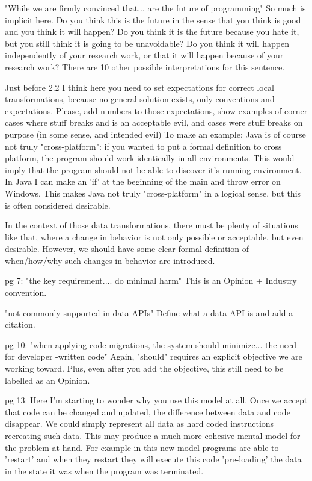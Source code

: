"While we are firmly convinced that... are the future of programming" So much is implicit here. Do you think this is the future in the sense that you think is good and you think it will happen? Do you think it is the future because you hate it, but you still think it is going to be unavoidable? Do you think it will happen independently of your research work, or that it will happen because of your research work? There are 10 other possible interpretations for this sentence.

Just before 2.2 I think here you need to set expectations for correct local transformations, because no general solution exists, only conventions and expectations. Please, add numbers to those expectations, show examples of corner cases where stuff breaks and is an acceptable evil, and cases were stuff breaks on purpose (in some sense, and intended evil) To make an example: Java is of course not truly "cross-platform": if you wanted to put a formal definition to cross platform, the program should work identically in all environments. This would imply that the program should not be able to discover it's running environment. In Java I can make an 'if' at the beginning of the main and throw error on Windows. This makes Java not truly "cross-platform" in a logical sense, but this is often considered desirable.

In the context of those data transformations, there must be plenty of situations like that, where a change in behavior is not only possible or acceptable, but even desirable. However, we should have some clear formal definition of when/how/why such changes in behavior are introduced.

pg 7: "the key requirement.... do minimal harm" This is an Opinion + Industry convention.

"not commonly supported in data APIs" Define what a data API is and add a citation.

pg 10: "when applying code migrations, the system should minimize... the need for developer -written code" Again, "should" requires an explicit objective we are working toward. Plus, even after you add the objective, this still need to be labelled as an Opinion.

pg 13: Here I'm starting to wonder why you use this model at all. Once we accept that code can be changed and updated, the difference between data and code disappear. We could simply represent all data as hard coded instructions recreating such data. This may produce a much more cohesive mental model for the problem at hand. For example in this new model programs are able to 'restart' and when they restart they will execute this code 'pre-loading' the data in the state it was when the program was terminated.

